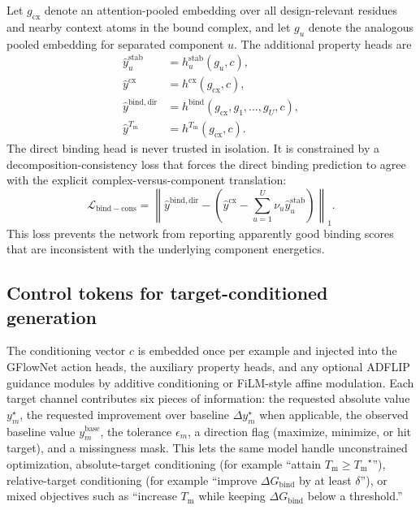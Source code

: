\documentclass[11pt]{article}
\newcommand{\Tm}{\ensuremath{T_{\mathrm m}}}
\newcommand{\DGbind}{\ensuremath{\Delta G_{\mathrm{bind}}}}
\begin{document}
	Let $g_{\mathrm{cx}}$ denote an attention-pooled embedding over all design-relevant residues and nearby context atoms in the bound complex, and let $g_u$ denote the analogous pooled embedding for separated component $u$. The additional property heads are
	\begin{align}
		\widehat y^{\mathrm{stab}}_{u} &= h^{\mathrm{stab}}_u(g_u,c),\\
		\widehat y^{\mathrm{cx}} &= h^{\mathrm{cx}}(g_{\mathrm{cx}},c),\\
		\widehat y^{\mathrm{bind,dir}} &= h^{\mathrm{bind}}(g_{\mathrm{cx}},g_1,\ldots,g_U,c),\\
		\widehat y^{\Tm} &= h^{\Tm}(g_{\mathrm{cx}},c).
	\end{align}
	The direct binding head is never trusted in isolation. It is constrained by a decomposition-consistency loss that forces the direct binding prediction to agree with the explicit complex-versus-component translation:
	\begin{equation}
		\label{eq:bindcons}
		\mathcal{L}_{\mathrm{bind-cons}} = \left\lVert \widehat y^{\mathrm{bind,dir}} - \left(\widehat y^{\mathrm{cx}} - \sum_{u=1}^{U}\nu_u\widehat y^{\mathrm{stab}}_{u}\right) \right\rVert_1.
	\end{equation}
	This loss prevents the network from reporting apparently good binding scores that are inconsistent with the underlying component energetics.
	
	
	\subsection{Control tokens for target-conditioned generation}
	
	The conditioning vector $c$ is embedded once per example and injected into the GFlowNet action heads, the auxiliary property heads, and any optional ADFLIP guidance modules by additive conditioning or FiLM-style affine modulation. Each target channel contributes six pieces of information: the requested absolute value $y_m^{\star}$, the requested improvement over baseline $\Delta y_m^{\star}$ when applicable, the observed baseline value $y_m^{\mathrm{base}}$, the tolerance $\epsilon_m$, a direction flag (maximize, minimize, or hit target), and a missingness mask. This lets the same model handle unconstrained optimization, absolute-target conditioning (for example ``attain $\Tm\ge \Tm^\star$''), relative-target conditioning (for example ``improve $\DGbind$ by at least $\delta$''), or mixed objectives such as ``increase $\Tm$ while keeping \DGbind{} below a threshold.''
	
\end{document}
